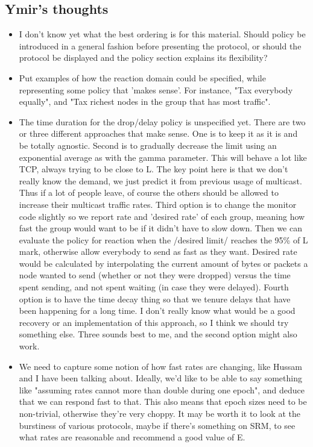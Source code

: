 \subsection{Ymir's thoughts}

\begin{itemize}
\item
 I don't know yet what the best ordering is for this material. Should policy be introduced in a general fashion before
  presenting the protocol, or should the protocol be displayed and the policy section explains its flexibility?
\item
 Put examples of how the reaction domain could be specified, while representing some policy that 'makes sense'.
  For instance, "Tax everybody equally", and "Tax richest nodes in the group that has most traffic".
\item
 The time duration for the drop/delay policy is unspecified yet. There are two or three different approaches that make sense.
  One is to keep it as it is and be totally agnostic. 
  Second is to gradually decrease the limit using an exponential average
  as with the gamma parameter. This will behave a lot like TCP, always trying to be close to L. The key point here is that
  we don't really know the demand, we just predict it from previous usage of multicast. Thus if a lot of people leave, of
  course the others should be allowed to increase their multicast traffic rates.
  Third option is to change the monitor code slightly so we report rate and 'desired rate' of each group, meaning how fast
  the group would want to be if it didn't have to slow down.
  Then we can evaluate the policy for reaction when the /desired limit/ reaches the 95\% of L mark, otherwise allow everybody
  to send as fast as they want. Desired rate would be calculated by interpolating the current amount of bytes or packets 
  a node wanted to send (whether or not they were dropped) versus the time spent sending, and not spent waiting (in case 
  they were delayed). 
  Fourth option is to have the time decay thing so that we tenure delays that have been happening for a long time. I don't
  really know what would be a good recovery or an implementation of this approach, so I think we should try something else.
  Three sounds best to me, and the second option might also work.
\item
  We need to capture some notion of how fast rates are changing, like Hussam and I have been talking about.
  Ideally, we'd like to be able to say something like "assuming rates cannot more than double during one epoch", and
  deduce that we can respond fast to that. This also means that epoch sizes need to be non-trivial, otherwise they're very
  choppy. It may be worth it to look at the burstiness of various protocols, maybe if there's something on SRM, to see what
  rates are reasonable and recommend a good value of E. 


\end{itemize}
